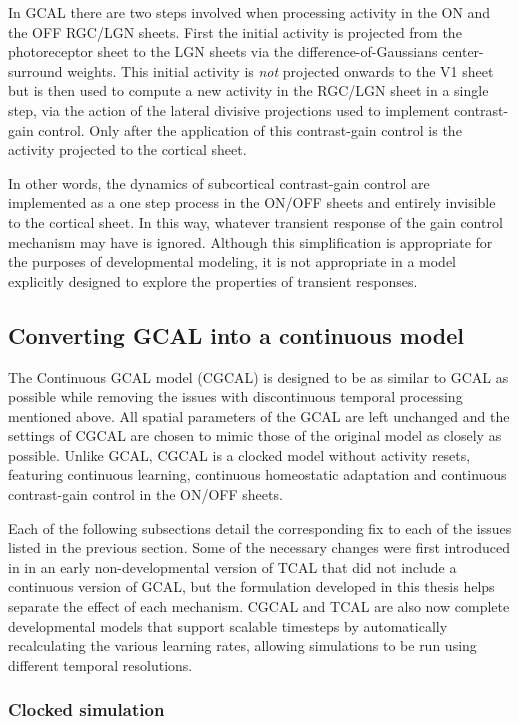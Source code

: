 \documentclass[phd,ianc,twoside]{infthesis}
\begin{document}
In GCAL there are two steps involved when processing activity in the ON
and the OFF RGC/LGN sheets. First the initial activity is projected from
the photoreceptor sheet to the LGN sheets via the
difference-of-Gaussians center-surround weights. This initial activity
is \emph{not} 
projected onwards to the V1 sheet but is then used to compute a new
activity in the RGC/LGN sheet in a single step, via the action of the
lateral divisive projections used to implement contrast-gain
control. Only after the application of this contrast-gain control is the
activity projected to the cortical sheet.

In other words, the dynamics of subcortical contrast-gain control are
implemented as a one step process in the ON/OFF sheets and entirely
invisible to the cortical sheet. In this way, whatever transient
response of the gain control mechanism may have is ignored.  Although
this simplification is appropriate for the purposes of developmental
modeling, it is not appropriate in a model explicitly designed to
explore the properties of transient responses.


\subsection{Converting GCAL into a continuous model}
\label{section:CGCAL}

The Continuous GCAL model (CGCAL) is designed to be as similar to GCAL
as possible while removing the issues with discontinuous temporal
processing mentioned above. All spatial parameters of the GCAL are left
unchanged and the settings of CGCAL are chosen to mimic those of the
original model as closely as possible. Unlike GCAL, CGCAL is a clocked
model without activity resets, featuring continuous learning, continuous
homeostatic adaptation and continuous contrast-gain control in the
ON/OFF sheets.

Each of the following subsections detail the corresponding fix to each
of the issues listed in the previous section. Some of the
necessary changes were first introduced in \citet{stevens_ms11} in an
early non-developmental version of TCAL that did not include a continuous
version of GCAL, but the formulation developed in this thesis helps
separate the effect of each mechanism. CGCAL and TCAL are also now complete
developmental models that support scalable timesteps by automatically
recalculating the various learning rates, allowing simulations to be
run using different temporal resolutions.


\subsubsection*{Clocked simulation}
\end{document}
